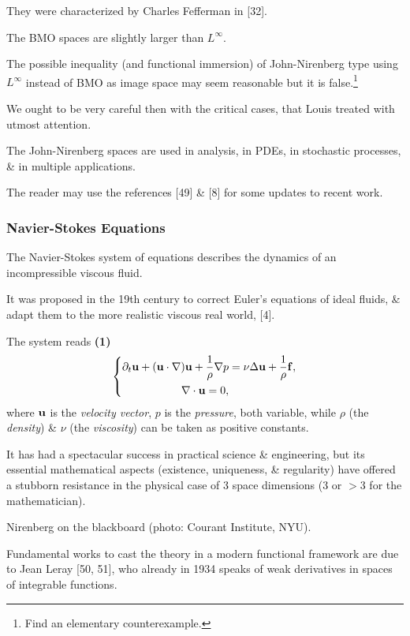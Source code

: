 \documentclass{article}
\begin{document}
They were characterized by Charles Fefferman in [32].

The BMO spaces are slightly larger than $L^\infty$.

The possible inequality (and functional immersion) of John-Nirenberg type using $L^\infty$ instead of BMO as image space may seem reasonable but it is false.\footnote{Find an elementary counterexample.}

We ought to be very careful then with the critical cases, that Louis treated with utmost attention.

The John-Nirenberg spaces are used in analysis, in PDEs, in stochastic processes, \& in multiple applications.

The reader may use the references [49] \& [8] for some updates to recent work.

\subsubsection{Navier-Stokes Equations}
The Navier-Stokes system of equations describes the dynamics of an incompressible viscous fluid.

It was proposed in the 19th century to correct Euler's equations of ideal fluids, \& adapt them to the more realistic viscous real world, [4].

The system reads \textbf{(1)}
\begin{equation*}
	\left\{\begin{split}
		\partial_t{\bf u} + ({\bf u}\cdot\nabla){\bf u} + \frac{1}{\rho}\nabla p &= \nu\Delta{\bf u} + \frac{1}{\rho}{\bf f},\\
		\nabla\cdot{\bf u} = 0,
	\end{split}\right.
\end{equation*}
where ${\bf u}$ is the \textit{velocity vector}, $p$ is the \textit{pressure}, both variable, while $\rho$ (the \textit{density}) \& $\nu$ (the \textit{viscosity}) can be taken as positive constants.

It has had a spectacular success in practical science \& engineering, but its essential mathematical aspects (existence, uniqueness, \& regularity) have offered a stubborn resistance in the physical case of 3 space dimensions (3 or $> 3$ for the mathematician).

\textsf{Nirenberg on the blackboard (photo: Courant Institute, NYU).}

%
Fundamental works to cast the theory in a modern functional framework are due to Jean Leray [50, 51], who already in 1934 speaks of weak derivatives in spaces of integrable functions.
\end{document}
